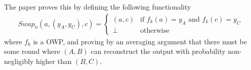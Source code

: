 \documentclass[11pt, a4paper]{article}
\theoremstyle{definition}
\theoremstyle{remark}
\begin{document}
The paper proves this by defining the following functionality
\begin{align*}
    Swap_{n}(a,(y_A,y_C),c) = \begin{cases}
        (a,c) & \text{if } f_k(a) = y_A \text{ and } f_k(c) = y_C\\
        \bot & \text{otherwise}
    \end{cases}
\end{align*}
where $f_k$ is a OWP, and proving by an averaging argument that there must be some round where $(A,B)$ can reconstruct the output with probability non-negligibly higher than $(B,C)$.
\end{document}
